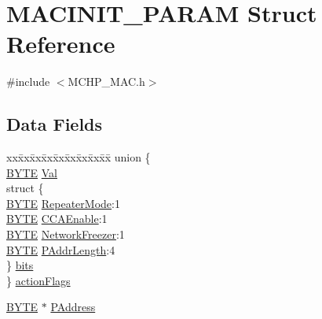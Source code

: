 \hypertarget{struct_m_a_c_i_n_i_t___p_a_r_a_m}{}\section{M\+A\+C\+I\+N\+I\+T\+\_\+\+P\+A\+R\+A\+M Struct Reference}
\label{struct_m_a_c_i_n_i_t___p_a_r_a_m}


{\ttfamily \#include $<$M\+C\+H\+P\+\_\+\+M\+A\+C.\+h$>$}

\subsection*{Data Fields}
\begin{DoxyCompactItemize}
\item 
\begin{tabbing}
xx\=xx\=xx\=xx\=xx\=xx\=xx\=xx\=xx\=\kill
union \{\\
\>\hyperlink{_generic_type_defs_8h_a4ae1dab0fb4b072a66584546209e7d58}{BYTE} \hyperlink{struct_m_a_c_i_n_i_t___p_a_r_a_m_a5ab8c2bf45b20b5f7aa3a4f083896cec}{Val}\\
\>struct \{\\
\>\>\hyperlink{_generic_type_defs_8h_a4ae1dab0fb4b072a66584546209e7d58}{BYTE} \hyperlink{struct_m_a_c_i_n_i_t___p_a_r_a_m_a0f95711f2c45472b9cd255e1ea4d2190}{RepeaterMode}:1\\
\>\>\hyperlink{_generic_type_defs_8h_a4ae1dab0fb4b072a66584546209e7d58}{BYTE} \hyperlink{struct_m_a_c_i_n_i_t___p_a_r_a_m_aed3546fd4913ed50a8a8a07f9035dc9b}{CCAEnable}:1\\
\>\>\hyperlink{_generic_type_defs_8h_a4ae1dab0fb4b072a66584546209e7d58}{BYTE} \hyperlink{struct_m_a_c_i_n_i_t___p_a_r_a_m_af5c01eeb3da726708df8c0af4a24db4a}{NetworkFreezer}:1\\
\>\>\hyperlink{_generic_type_defs_8h_a4ae1dab0fb4b072a66584546209e7d58}{BYTE} \hyperlink{struct_m_a_c_i_n_i_t___p_a_r_a_m_a9c25ded82cd2a92ffb26ea8b8530fdb9}{PAddrLength}:4\\
\>\} \hyperlink{struct_m_a_c_i_n_i_t___p_a_r_a_m_a33c13c1cb6c3f879a1a7f0aa1a608251}{bits}\\
\} \hyperlink{struct_m_a_c_i_n_i_t___p_a_r_a_m_a43d124e86f5f26774af4909e6b12e776}{actionFlags}\\

\end{tabbing}\item 
\hyperlink{_generic_type_defs_8h_a4ae1dab0fb4b072a66584546209e7d58}{B\+Y\+T\+E} $\ast$ \hyperlink{struct_m_a_c_i_n_i_t___p_a_r_a_m_a6c8451b9b9fd68f77ebd2d57df6b376b}{P\+Address}
\end{DoxyCompactItemize}


